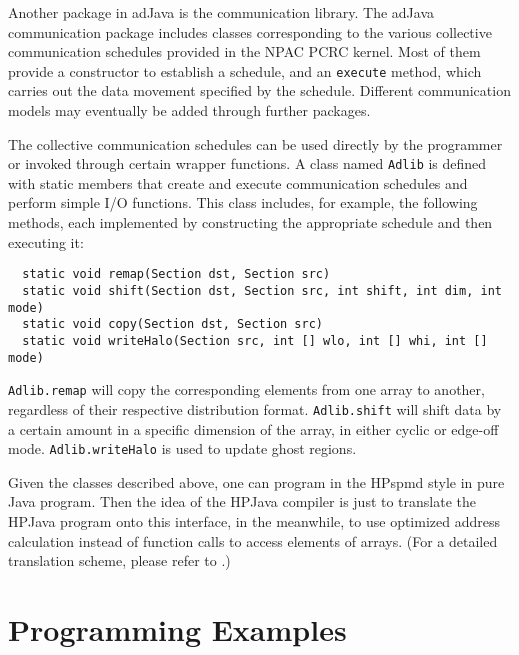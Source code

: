 Another package in adJava is the communication library.
The adJava communication package includes classes corresponding to the
various collective communication schedules provided in the NPAC PCRC
kernel.  Most of them provide a constructor to establish a schedule,
and an \texttt{execute} method, which carries out the data movement
specified by the schedule.  Different
communication models may eventually be added through further packages.

The collective communication schedules can be used directly by
the programmer or invoked through certain wrapper functions.
A class named \texttt{Adlib} is defined
with static members that create and execute
communication schedules and perform simple I/O functions. 
This class includes, for example, the following
methods, each implemented by
constructing the appropriate schedule and then executing it:
\begin{small}
\begin{verbatim}
  static void remap(Section dst, Section src)
  static void shift(Section dst, Section src, int shift, int dim, int mode)
  static void copy(Section dst, Section src)
  static void writeHalo(Section src, int [] wlo, int [] whi, int [] mode)
\end{verbatim}
\end{small}
\texttt{Adlib.remap} will copy the
corresponding elements from one array to another, regardless of their
respective distribution format.  \texttt{Adlib.shift} will shift data
by a certain amount in a specific dimension of the array, in either
cyclic or edge-off mode.  \texttt{Adlib.writeHalo} is used to update
ghost regions.

Given the classes described above, one can program in the HPspmd style
in pure Java program.  Then the idea of the HPJava compiler is just to
translate the HPJava program onto this interface, in the meanwhile, to use
optimized address calculation instead of function calls to access
elements of arrays. (For a detailed translation scheme, please refer to
\cite{Zha98}.)


\section{Programming Examples}
\label{sec:examples}

